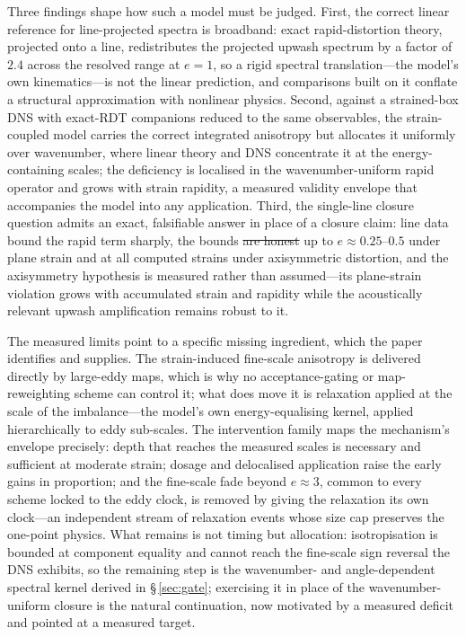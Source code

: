 \documentclass[lineno]{JFM-FLM_Au}
\providecommand{\DIFadd}[1]{{\protect\color{blue}\uwave{#1}}} %
\providecommand{\DIFdel}[1]{{\protect\color{red}\sout{#1}}} %
\providecommand{\DIFaddbegin}{} %
\providecommand{\DIFaddend}{} %
\providecommand{\DIFdelbegin}{} %
\providecommand{\DIFdelend}{} %
\begin{document}
Three findings shape how such a model must be judged. First, the
correct linear reference for line-projected spectra is broadband: exact
rapid-distortion theory, projected onto a line, redistributes the
projected upwash spectrum by a factor of $2.4$ across the resolved range
at $e=1$, so a rigid spectral translation---the model's own
kinematics---is not the linear prediction, and comparisons built on it
conflate a structural approximation with nonlinear physics. Second,
against a strained-box DNS with exact-RDT companions reduced to the
same observables, the strain-coupled model carries the correct
integrated anisotropy but allocates it uniformly over wavenumber, where
linear theory and DNS concentrate it at the energy-containing scales;
the deficiency is localised in the wavenumber-uniform rapid operator
and grows with strain rapidity, a measured validity envelope that
accompanies the model into any application. Third, the single-line
closure question admits an exact, falsifiable answer in place of a
closure claim: line data bound the rapid term sharply, the bounds \DIFdelbegin \DIFdel{are
honest }\DIFdelend \DIFaddbegin \DIFadd{hold }\DIFaddend up to $e\approx0.25$--$0.5$ under plane strain and at all
computed strains under axisymmetric distortion, and the axisymmetry
hypothesis is measured rather than assumed---its plane-strain violation
grows with accumulated strain and rapidity while the acoustically
relevant upwash amplification remains robust to it.

The measured limits point to a specific missing ingredient, which the
paper identifies and supplies. The strain-induced fine-scale
anisotropy is delivered directly by large-eddy maps, which is why no
acceptance-gating or map-reweighting scheme can control it; what does
move it is relaxation applied at the scale of the imbalance---the
model's own energy-equalising kernel, applied hierarchically to eddy
sub-scales. The intervention family maps the mechanism's envelope
precisely: depth that reaches the measured scales is necessary and
sufficient at moderate strain; dosage and delocalised application
raise the early gains in proportion; and the fine-scale fade beyond
$e\approx3$, common to every scheme locked to the eddy clock, is
removed by giving the relaxation its own clock---an independent stream
of relaxation events whose size cap preserves the one-point
physics. What remains is not timing but allocation: isotropisation is
bounded at component equality and cannot reach the fine-scale sign
reversal the DNS exhibits, so the remaining step is the
wavenumber- and angle-dependent spectral kernel derived in
\S\,\ref{sec:gate}; exercising it in place of the wavenumber-uniform
closure is the natural continuation, now motivated by a measured
deficit and pointed at a measured target.
\end{document}
